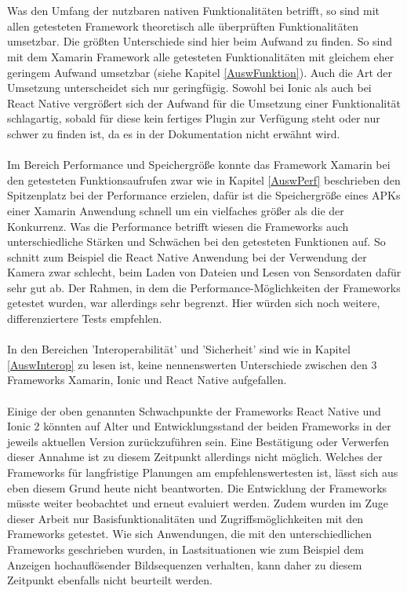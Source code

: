 \\
\\
Was den Umfang der nutzbaren nativen Funktionalitäten betrifft, so sind mit allen getesteten Framework theoretisch alle überprüften Funktionalitäten umsetzbar. Die größten Unterschiede sind hier beim Aufwand zu finden. So sind mit dem Xamarin Framework alle getesteten Funktionalitäten mit gleichem eher geringem Aufwand umsetzbar (siehe Kapitel \ref{AuswFunktion}). Auch die Art der Umsetzung unterscheidet sich nur geringfügig. Sowohl bei Ionic als auch bei React Native vergrößert sich der Aufwand für die Umsetzung einer Funktionalität schlagartig, sobald für diese kein fertiges Plugin zur Verfügung steht oder nur schwer zu finden ist, da es in der Dokumentation nicht erwähnt wird.
\\
\\
Im Bereich Performance und Speichergröße konnte das Framework Xamarin bei den getesteten Funktionsaufrufen zwar wie in Kapitel \ref{AuswPerf} beschrieben den Spitzenplatz bei der Performance erzielen, dafür ist die Speichergröße eines APKs einer Xamarin Anwendung schnell um ein vielfaches größer als die der Konkurrenz. Was die Performance betrifft wiesen die Frameworks auch unterschiedliche Stärken und Schwächen bei den getesteten Funktionen auf. So schnitt zum Beispiel die React Native Anwendung bei der Verwendung der Kamera zwar schlecht, beim Laden von Dateien und Lesen von Sensordaten dafür sehr gut ab. Der Rahmen, in dem die Performance-Möglichkeiten der Frameworks getestet wurden, war allerdings sehr begrenzt. Hier würden sich noch weitere, differenziertere Tests empfehlen.
\\
\\
In den Bereichen 'Interoperabilität' und 'Sicherheit' sind wie in Kapitel \ref{AuswInterop} zu lesen ist, keine nennenswerten Unterschiede zwischen den 3 Frameworks Xamarin, Ionic und React Native aufgefallen.
\\
\\
Einige der oben genannten Schwachpunkte der Frameworks React Native und Ionic 2 könnten auf Alter und Entwicklungsstand der beiden Frameworks in der jeweils aktuellen Version zurückzuführen sein. Eine Bestätigung oder Verwerfen dieser Annahme ist zu diesem Zeitpunkt allerdings nicht möglich. Welches der Frameworks für langfristige Planungen am empfehlenswertesten ist, lässt sich aus eben diesem Grund heute nicht beantworten. Die Entwicklung der Frameworks müsste weiter beobachtet und erneut evaluiert werden. Zudem wurden im Zuge dieser Arbeit nur Basisfunktionalitäten und Zugriffsmöglichkeiten mit den Frameworks getestet. Wie sich Anwendungen, die mit den unterschiedlichen Frameworks geschrieben wurden, in Lastsituationen wie zum Beispiel dem Anzeigen hochauflösender Bildsequenzen verhalten, kann daher zu diesem Zeitpunkt ebenfalls nicht beurteilt werden.